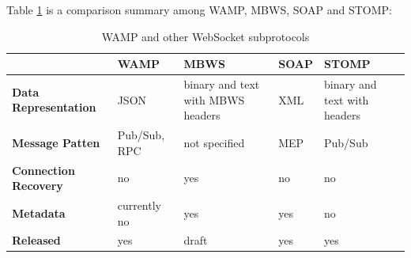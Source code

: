 Table \ref{table:subprotocol-comparison} is a comparison summary among WAMP, MBWS, SOAP and STOMP:

\begin{table}
\begin{tabular}{|p{2.2cm}|>{\centering\arraybackslash}p{2.2cm}|>{\centering\arraybackslash}p{3cm}|>{\centering\arraybackslash}p{1.5cm}|>{\centering\arraybackslash}p{2.9cm}|} 
\hline %
\textbf{ } & \textbf{WAMP} & \textbf{MBWS} & \textbf{SOAP} & \textbf{STOMP} \\ 
\hline 
\textbf{Data Representation} & JSON & binary and text with MBWS headers & XML & binary and text with headers \\ 
\hline
\textbf{Message Patten} & Pub/Sub, RPC & not specified & MEP & Pub/Sub \\
\hline
\textbf{Connection Recovery} & no & yes & no & no \\
\hline
\textbf{Metadata} & currently no & yes & yes & no \\
\hline
\textbf{Released} & yes & draft & yes & yes \\
\hline
\end{tabular} %
\caption{WAMP and other WebSocket subprotocols}
\label{table:subprotocol-comparison}
\end{table} %
